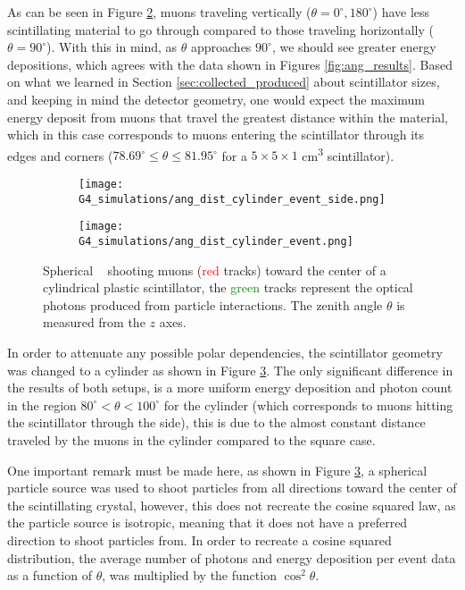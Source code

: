 As can be seen in Figure \ref{sfig:ang_dist_cyl_side}, muons traveling vertically ($\theta=0^\circ, 180^\circ$) have less scintillating material to go through compared to those traveling horizontally ($\theta=90^\circ$). With this in mind, as $\theta$ approaches $90^\circ$, we should see greater energy depositions, which agrees with the data shown in Figures \ref{fig:ang_results}. Based on what we learned in Section \ref{sec:collected_produced} about scintillator sizes, and keeping in mind the detector geometry, one would expect the maximum energy deposit from muons that travel the greatest distance within the material, which in this case corresponds to muons entering the scintillator through its edges and corners ($78.69^\circ\leq\theta\leq 81.95^\circ$ for a $5\times5\times1$ \unit{\cm\cubed} scintillator).

\begin{figure}[H]
  \centering
  \begin{subfigure}[t]{0.48\textwidth}
    \texttt{[image: G4\_simulations/ang\_dist\_cylinder\_event\_side.png]}
    \caption{\label{sfig:ang_dist_cyl}}
  \end{subfigure}
  \hfill
  \begin{subfigure}[t]{0.48\textwidth}
    \texttt{[image: G4\_simulations/ang\_dist\_cylinder\_event.png]}
    \caption{\label{sfig:ang_dist_cyl_side}}
  \end{subfigure}
  \caption{\label{fig:ang_dist_cyl_event}Spherical \gps~ shooting muons (\textcolor{red}{red} tracks) toward the center of a cylindrical plastic scintillator, the \textcolor{green}{green} tracks represent the optical photons produced from particle interactions. The zenith angle $\theta$ is measured from the $z$ axes.}
\end{figure}

In order to attenuate any possible polar dependencies, the scintillator geometry was changed to a cylinder as shown in Figure \ref{fig:ang_dist_cyl_event}. The only significant difference in the results of both setups, is a more uniform energy deposition and photon count in the region $80^\circ<\theta< 100^\circ$ for the cylinder (which corresponds to muons hitting the scintillator through the side), this is due to the almost constant distance traveled by the muons in the cylinder compared to the square case.

One important remark must be made here, as shown in Figure \ref{fig:ang_dist_cyl_event}, a spherical particle source was used to shoot particles from all directions toward the center of the scintillating crystal, however, this does not recreate the cosine squared law, as the particle source is isotropic, meaning that it does not have a preferred direction to shoot particles from. In order to recreate a cosine squared distribution, the average number of photons and energy deposition per event data as a function of $\theta$, was multiplied by the function $\cos^2\theta$.

